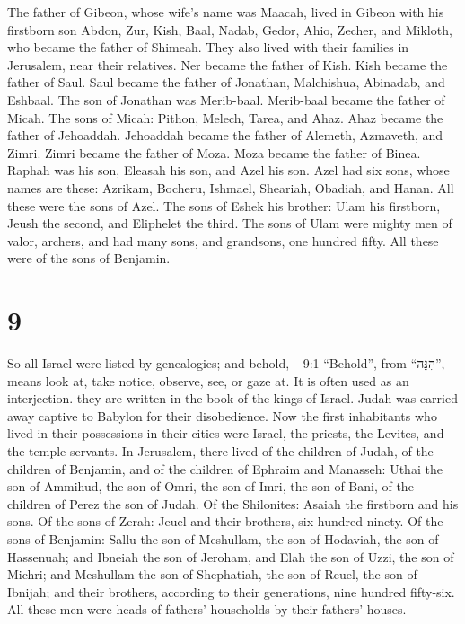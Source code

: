  The father of Gibeon, whose wife's name was Maacah, lived
in Gibeon  with his firstborn son Abdon, Zur, Kish, Baal,
Nadab,  Gedor, Ahio, Zecher,  and Mikloth, who
became the father of Shimeah. They also lived with their families in
Jerusalem, near their relatives.  Ner became the father of
Kish. Kish became the father of Saul. Saul became the father of
Jonathan, Malchishua, Abinadab, and Eshbaal.  The son of
Jonathan was Merib-baal. Merib-baal became the father of Micah.
 The sons of Micah: Pithon, Melech, Tarea, and Ahaz.
 Ahaz became the father of Jehoaddah. Jehoaddah became the
father of Alemeth, Azmaveth, and Zimri. Zimri became the father of Moza.
 Moza became the father of Binea. Raphah was his son,
Eleasah his son, and Azel his son.  Azel had six sons,
whose names are these: Azrikam, Bocheru, Ishmael, Sheariah, Obadiah, and
Hanan. All these were the sons of Azel.  The sons of Eshek
his brother: Ulam his firstborn, Jeush the second, and Eliphelet the
third.  The sons of Ulam were mighty men of valor, archers,
and had many sons, and grandsons, one hundred fifty. All these were of
the sons of Benjamin.

\hypertarget{section-8}{%
\section{9}\label{section-8}}

 So all Israel were listed by genealogies; and behold,+ 9:1
``Behold'', from ``הִנֵּה'', means look at, take notice, observe, see,
or gaze at. It is often used as an interjection. they are written in the
book of the kings of Israel. Judah was carried away captive to Babylon
for their disobedience.  Now the first inhabitants who lived
in their possessions in their cities were Israel, the priests, the
Levites, and the temple servants.  In Jerusalem, there lived
of the children of Judah, of the children of Benjamin, and of the
children of Ephraim and Manasseh:  Uthai the son of Ammihud,
the son of Omri, the son of Imri, the son of Bani, of the children of
Perez the son of Judah.  Of the Shilonites: Asaiah the
firstborn and his sons.  Of the sons of Zerah: Jeuel and
their brothers, six hundred ninety.  Of the sons of
Benjamin: Sallu the son of Meshullam, the son of Hodaviah, the son of
Hassenuah;  and Ibneiah the son of Jeroham, and Elah the son
of Uzzi, the son of Michri; and Meshullam the son of Shephatiah, the son
of Reuel, the son of Ibnijah;  and their brothers, according
to their generations, nine hundred fifty-six. All these men were heads
of fathers' households by their fathers' houses.


